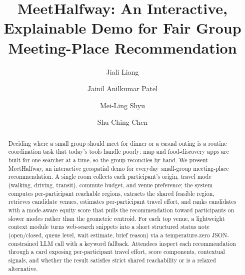 \documentclass[sigconf]{acmart}
\begin{document}
\title{MeetHalfway: An Interactive, Explainable Demo for Fair Group Meeting-Place Recommendation}

\author{Jiali Liang}

\author{Jainil Anilkumar Patel}

\author{Mei-Ling Shyu}

\author{Shu-Ching Chen}

\renewcommand{\shortauthors}{Liang et al.}

\begin{abstract}
  Deciding where a small group should meet for dinner or a casual outing is a routine coordination task that today's tools handle poorly: map and food-discovery apps are built for one searcher at a time, so the group reconciles by hand. We present MeetHalfway, an interactive geospatial demo for everyday small-group meeting-place recommendation. A single room collects each participant's origin, travel mode (walking, driving, transit), commute budget, and venue preference; the system computes per-participant reachable regions, extracts the shared feasible region, retrieves candidate venues, estimates per-participant travel effort, and ranks candidates with a mode-aware equity score that pulls the recommendation toward participants on slower modes rather than the geometric centroid. For each top venue, a lightweight context module turns web-search snippets into a short structured status note (open/closed, queue level, wait estimate, brief reason) via a temperature-zero JSON-constrained LLM call with a keyword fallback. Attendees inspect each recommendation through a card exposing per-participant travel effort, score components, contextual signals, and whether the result satisfies strict shared reachability or is a relaxed alternative.
\end{abstract}
\end{document}
